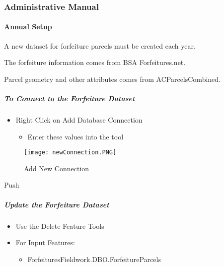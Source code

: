   \subsubsection{Administrative Manual}

  \paragraph{Annual Setup}

  A new dataset for forfeiture parcels must be created each year.

  \noindent The forfeiture information comes from BSA Forfeitures.net.

  \noindent Parcel geometry and other attributes comes from ACParcelsCombined.



 \subparagraph{To Connect to the Forfeiture Dataset}

  \begin{itemize}
  \item {\Large Right Click on Add Database Connection}

  \begin{itemize}
  \item {\Large Enter these values into the tool}
  \end{itemize}
  \end{itemize}

  \vspace{.1in}

  \begin{figure}[h!]
  \centering
      \texttt{[image: newConnection.PNG]}
  \caption{Add New Connection}
  \end{figure}
  \vspace{.15in}

 {\bigbtn Push }

 \clearpage


  \subparagraph{Update the Forfeiture Dataset}

  \begin{itemize}
  \item {\Large Use the Delete Feature Tools}
  \item {\Large For Input Features:}
  \begin{itemize}
  \item {\Large ForfeituresFieldwork.DBO.ForfeitureParcels}
  \end{itemize}
  \end{itemize}

